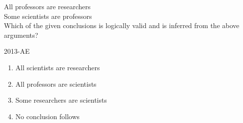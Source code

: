 \item All professors are researchers\\
Some scientists are professors\\

Which of the given conclusions is logically valid and is inferred from the above arguments?

\hfill{2013-AE}

\begin{enumerate}
    \item All scientists are researchers
    \item All professors are scientists
    \item Some researchers are scientists
    \item No conclusion follows
\end{enumerate}

